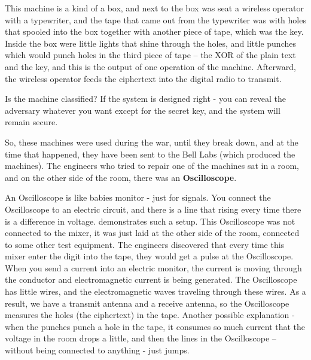 This machine is a kind of a box, and next to the box was seat a wireless operator with a typewriter, and the tape that came out from the typewriter was with holes that spooled into the box together with another piece of tape, which was the key. Inside the box were little lights that shine through the holes, and little punches which would punch holes in the third piece of tape – the XOR of the plain text and the key, and this is the output of one operation of the machine. Afterward, the wireless operator feeds the ciphertext into the digital radio to transmit.

Is the machine classified? If the system is designed right - you can reveal the adversary whatever you want except for the secret key, and the system will remain secure.

So, these machines were used during the war, until they break down, and at the time that happened, they have been sent to the Bell Labs (which produced the machines). The engineers who tried to repair one of the machines sat in a room, and on the other side of the room, there was an \textbf{Oscilloscope}. 

An Oscilloscope is like babies monitor - just for signals. You connect the Oscilloscope to an electric circuit, and there is a line that rising every time there is a difference in voltage.  demonstrates such a setup.
This Oscilloscope was not connected to the mixer, it was just laid at the other side of the room, connected to some other test equipment. The engineers discovered that every time this mixer enter the digit into the tape, they would get a pulse at the Oscilloscope. When you send a current into an electric monitor, the current is moving through the conductor and electromagnetic current is being generated. The Oscilloscope has little wires, and the electromagnetic waves traveling through these wires. As a result, we have a transmit antenna and a receive antenna, so the Oscilloscope measures the holes (the ciphertext) in the tape. Another possible explanation - when the punches punch a hole in the tape, it consumes so much current that the voltage in the room drops a little, and then the lines in the Oscilloscope – without being connected to anything -  just jumps.


